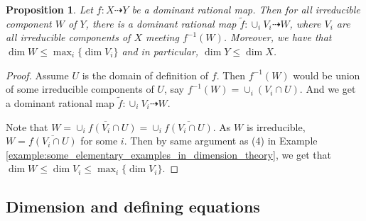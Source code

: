 \documentclass{ctexart}
\newtheorem{proposition}{Proposition}[section]
\begin{document}
\begin{proposition}
    Let $f: X \dashrightarrow Y$ be a dominant rational map.
    Then for all irreducible component $W$ of $Y$, there is a dominant rational map $\widetilde{f}: \cup_{i} V_{i} \dashrightarrow W$,
    where $V_{i}$ are all irreducible components of $X$ meeting $f^{-1}(W)$.
    Moreover, we have that $\dim W \le \max_{i} \{\dim V_{i}\}$ and in particular, $\dim Y \le \dim X$.
    \label{Proposition 4.4}
\end{proposition}
\begin{proof}
    Assume $U$ is the domain of definition of $f$.
    Then $f^{-1}(W)$ would be union of some irreducible components of $U$, say $f^{-1}(W) = \cup_{i} (V_{i} \cap U)$.
    And we get a dominant rational map $\widetilde{f}: \cup_{i} V_{i} \dashrightarrow W$.
    \par
    Note that $W = \overline{\cup_{i} f(V_{i} \cap U)} = \cup_{i} \overline{f(V_{i} \cap U)}$.
    As $W$ is irreducible, $W = \overline{f(V_{i} \cap U)}$ for some $i$.
    Then by same argument as (4) in Example \ref{example:some_elementary_examples_in_dimension_theory},
    we get that $\dim W \le \dim V_{i} \le \max_{i} \{\dim V_{i}\}$. 
\end{proof}

\subsection{Dimension and defining equations}
\label{subsection:Dimension_Theory_Dimension_and_defining_equations}
\end{document}
